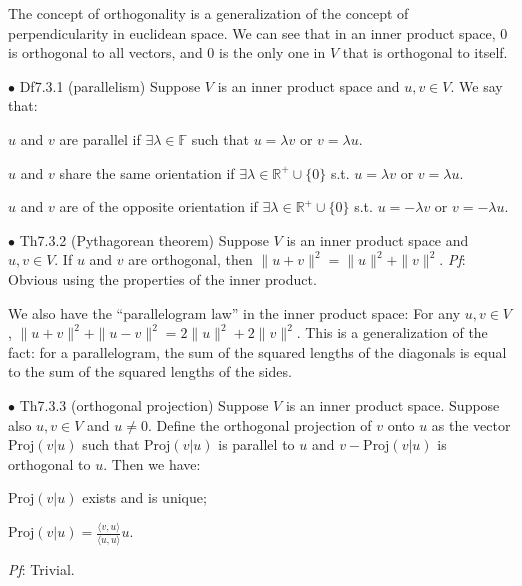 \documentclass{article}
\begin{document}
\begin{Rmk}{}
    The concept of orthogonality is a generalization of the concept of perpendicularity in euclidean space. We can see that \textcolor{Th}{in an inner product space, $0$ is orthogonal to all vectors, and $0$ is the only one in $V$ that is orthogonal to itself.}
\end{Rmk}

\begin{Df}{$\bullet$ Df7.3.1 (parallelism)}
    Suppose $V$ is an inner product space and $u, v\in V$. We say that:
    \begin{compactenum}
        \item $u$ and $v$ are parallel if $\exists \lambda\in\mathbb{F}$ such that $u = \lambda v$ or $v = \lambda u$.
        \item $u$ and $v$ share the same orientation if $\exists \lambda\in\mathbb{R}^+\cup \{0\}$ s.t. $u = \lambda v$ or $v = \lambda u$.
        \item $u$ and $v$ are of the opposite orientation if $\exists \lambda\in\mathbb{R}^+\cup \{0\}$ s.t. $u = -\lambda v$ or $v = -\lambda u$. 
    \end{compactenum}
\end{Df}

\begin{Th}{$\bullet$ Th7.3.2 (Pythagorean theorem)}
    Suppose $V$ is an inner product space and $u, v\in V$. If $u$ and $v$ are orthogonal, then $\|u+v\|^2 = \|u\|^2 + \|v\|^2$.
    \tcblower
    \textit{Pf}: Obvious using the properties of the inner product.
\end{Th}

\begin{Rmk}{}
    We also have the ``parallelogram law'' in the inner product space: \textcolor{Th}{For any $u, v\in V$, $\|u+v\|^2 + \|u-v\|^2 = 2\|u\|^2 + 2\|v\|^2$.} This is a generalization of the fact: for a parallelogram, the sum of the squared lengths of the diagonals is equal to the sum of the squared lengths of the sides.
\end{Rmk}

\begin{Th}{$\bullet$ Th7.3.3 (orthogonal projection)}
    Suppose $V$ is an inner product space. Suppose also $u, v\in V$ and $u\neq 0$. \textcolor{Df}{Define the orthogonal projection of $v$ onto $u$ as the vector $\text{Proj}(v|u)$ such that $\text{Proj}(v|u)$ is parallel to $u$ and $v-\text{Proj}(v|u)$ is orthogonal to $u$.} Then we have:
    \begin{compactenum}
        \item $\text{Proj}(v|u)$ exists and is unique;
        \item $\text{Proj}(v|u) = \frac{\langle v, u\rangle}{\langle u, u\rangle}u$.
    \end{compactenum}
    \tcblower
    \textit{Pf}: Trivial.
\end{Th}
\end{document}
